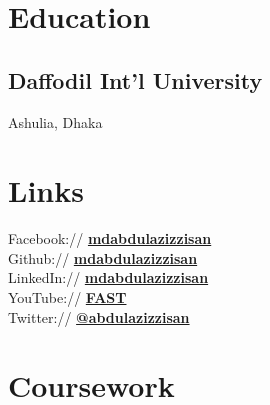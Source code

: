 \documentclass[]{deedy-resume-openfont}
\begin{document}
%
%

%
%

%
%

\begin{minipage}[t]{0.33\textwidth} 


\section{Education} 

\subsection{Daffodil Int'l University}
Ashulia, Dhaka\\
\sectionsep



\section{Links} 
Facebook:// \href{https://facebook.com/mdabdulazizzisan}{\bf mdabdulazizzisan} \\
Github:// \href{https://github.com/mdabdulazizzisan}{\bf mdabdulazizzisan} \\
LinkedIn://  \href{https://www.linkedin.com/in/mdabdulazizzisan}{\bf mdabdulazizzisan} \\
YouTube://  \href{ https://www.youtube.com/@FreeAltSoftwareTutorials }{\bf FAST} \\
Twitter://  \href{https://twitter.com/abdulazizzisan}{\bf @abdulazizzisan} \\


\section{Coursework}

\end{minipage}
\end{document}

